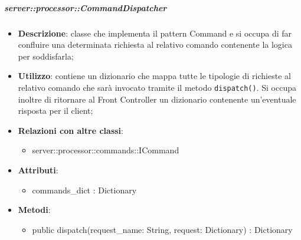     \subparagraph{server::processor::CommandDispatcher} %
    \label{subp:bdsm_app_server_:processor_commanddispatcher}
    \begin{itemize}
      \item \textbf{Descrizione}: classe che implementa il pattern Command e si occupa di far confluire una determinata richiesta al relativo comando contenente la logica per soddisfarla;
      \item \textbf{Utilizzo}: contiene un dizionario che mappa tutte le tipologie di richieste al relativo comando che sarà invocato tramite il metodo \texttt{dispatch()}. Si occupa inoltre di ritornare al Front Controller un dizionario contenente un'eventuale risposta per il client;
      \item \textbf{Relazioni con altre classi}:
        \begin{itemize}
          \item server::processor::commands::ICommand
        \end{itemize}
		\item \textbf{Attributi}:
        	\begin{itemize}
          		\item commands\_dict : Dictionary
        	\end{itemize}
		\item \textbf{Metodi}:
        	\begin{itemize}
          		\item public dispatch(request_name: String, request: Dictionary) : Dictionary
        	\end{itemize}
      \end{itemize}

